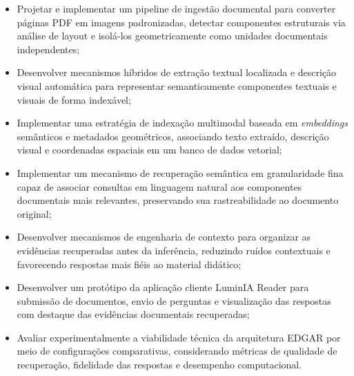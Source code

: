 \begin{itemize}
    \item[-] Projetar e implementar um pipeline de ingestão documental para converter páginas 
    PDF em imagens padronizadas, detectar componentes estruturais via análise de layout e 
    isolá-los geometricamente como unidades documentais independentes;

    \item[-] Desenvolver mecanismos híbridos de extração textual localizada e descrição visual 
    automática para representar semanticamente componentes textuais e visuais de forma 
    indexável;

    \item[-] Implementar uma estratégia de indexação multimodal baseada em \textit{embeddings} 
    semânticos e metadados geométricos, associando texto extraído, descrição visual e 
    coordenadas espaciais em um banco de dados vetorial;

    \item[-] Implementar um mecanismo de recuperação semântica em granularidade fina capaz 
    de associar consultas em linguagem natural aos componentes documentais mais relevantes, 
    preservando sua rastreabilidade ao documento original;

    \item[-] Desenvolver mecanismos de engenharia de contexto para organizar as evidências 
    recuperadas antes da inferência, reduzindo ruídos contextuais e favorecendo respostas 
    mais fiéis ao material didático;

    \item[-] Desenvolver um protótipo da aplicação cliente LuminIA Reader para submissão de 
    documentos, envio de perguntas e visualização das respostas com destaque das evidências 
    documentais recuperadas;

    \item[-] Avaliar experimentalmente a viabilidade técnica da arquitetura EDGAR por meio 
    de configurações comparativas, considerando métricas de qualidade de recuperação, 
    fidelidade das respostas e desempenho computacional.
\end{itemize}
